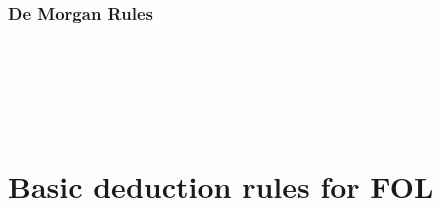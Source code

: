 \begin{multicols}{2}
%
%

\subsubsection*{De Morgan Rules}
\begin{pf}

\\	

\\	

\\	
\end{pf}
\end{multicols}

\newpage

\section{Basic deduction rules for FOL}


